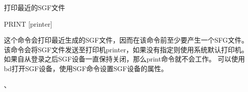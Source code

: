 \label{cmd:print}

打印最近的SGF文件

\begin{SACSTX}
PRINT [printer]
\end{SACSTX}

这个命令会打印最近生成的SGF文件，因而在该命令前至少要产生一个SFG文件。
该命令会将SGF文件发送至打印机printer，如果没有指定则使用系统默认打印机。
如果自从登录之后SGF设备一直保持关闭，那么print命令就不会工作。
可以使用bd打开SGF设备，使用SGF命令设置SGF设备的属性。

、
